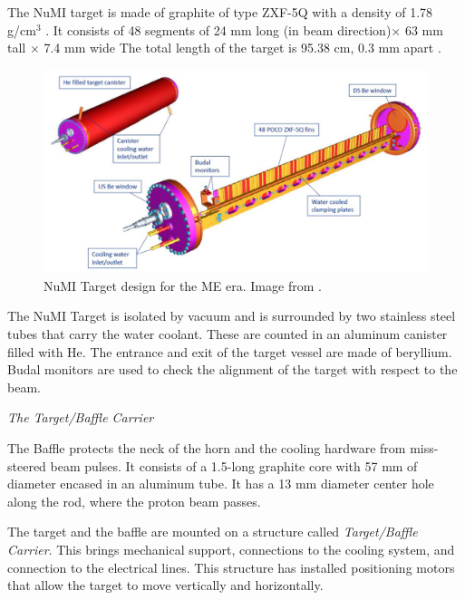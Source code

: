 The NuMI target is made of graphite of type ZXF-5Q with a density of 1.78 g/cm$^3$ \cite{Numi}. It consists of 48 segments of 24 mm long (in beam direction)$\times$ 63 mm tall $\times$ 7.4 mm wide The total length of the target is 95.38 cm, 0.3 mm apart \cite{BenThesis}.

\begin{figure}[!htb]
\centering
\includegraphics[scale=0.33]{Figures/Chapter2/NuMITarget.png}
        \caption{NuMI Target design for the ME era. Image from \cite{NuMITarget}.} 
\label{fig:MnvExp:NuMI:NuMITarget}
\end{figure}

The NuMI Target is isolated by vacuum and is surrounded by two stainless steel tubes that carry the water coolant. These are counted in an aluminum canister filled with He. The entrance and exit of the target vessel are made of beryllium. Budal monitors \cite{Budal} are used to check the alignment of the target with respect to the beam. 

\textit{The Target/Baffle Carrier}

The Baffle \cite{NOvATDR} protects the neck of the horn and the cooling hardware from miss-steered beam pulses. It consists of a 1.5-long graphite core with 57 mm of diameter encased in an aluminum tube. It has a 13 mm diameter center hole along the rod, where the proton beam passes. 

The target and the baffle are mounted on a structure called \textit{Target/Baffle Carrier}. This brings mechanical support, connections to the cooling system, and connection to the electrical lines. This structure has installed positioning motors that allow the target to move vertically and horizontally. 

